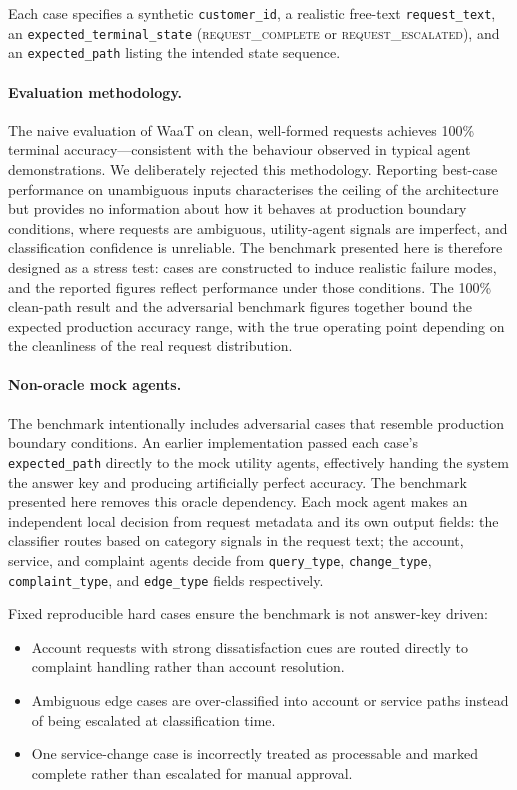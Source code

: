 \documentclass[10pt,conference]{IEEEtran}
\begin{document}
Each case specifies a synthetic \texttt{customer\_id}, a realistic
free-text \texttt{request\_text}, an
\texttt{expected\_terminal\_state} (\textsc{request\_complete} or
\textsc{request\_escalated}), and an \texttt{expected\_path}
listing the intended state sequence.

\paragraph{Evaluation methodology.}
The naive evaluation of WaaT on clean, well-formed requests
achieves 100\% terminal accuracy---consistent with the behaviour
observed in typical agent demonstrations.  We deliberately
rejected this methodology.  Reporting best-case performance on
unambiguous inputs characterises the ceiling of the architecture
but provides no information about how it behaves at production
boundary conditions, where requests are ambiguous, utility-agent
signals are imperfect, and classification confidence is
unreliable.  The benchmark presented here is therefore designed
as a stress test: cases are constructed to induce realistic
failure modes, and the reported figures reflect performance under
those conditions.  The 100\% clean-path result and the adversarial
benchmark figures together bound the expected production accuracy
range, with the true operating point depending on the cleanliness
of the real request distribution.

\paragraph{Non-oracle mock agents.}
The benchmark intentionally includes adversarial cases that
resemble production boundary conditions.  An earlier
implementation passed each case's \texttt{expected\_path}
directly to the mock utility agents, effectively handing the
system the answer key and producing artificially perfect accuracy.
The benchmark presented here removes this oracle dependency.  Each
mock agent makes an independent local decision from request
metadata and its own output fields: the classifier routes based on
category signals in the request text; the account, service, and
complaint agents decide from \texttt{query\_type},
\texttt{change\_type}, \texttt{complaint\_type}, and
\texttt{edge\_type} fields respectively.

Fixed reproducible hard cases ensure the benchmark is not
answer-key driven:
\begin{itemize}
  \item Account requests with strong dissatisfaction cues are
        routed directly to complaint handling rather than account
        resolution.
  \item Ambiguous edge cases are over-classified into account or
        service paths instead of being escalated at classification
        time.
  \item One service-change case is incorrectly treated as
        processable and marked complete rather than escalated for
        manual approval.
\end{itemize}
\end{document}
